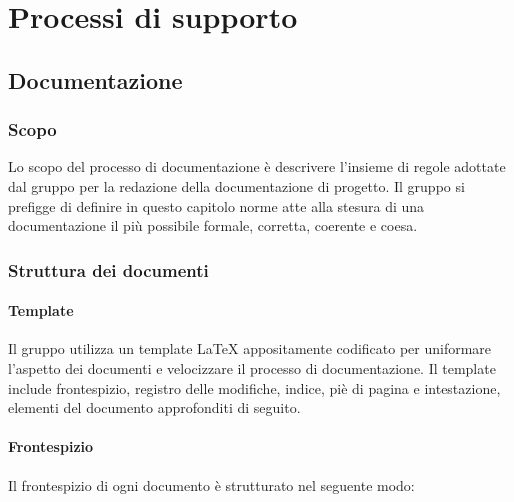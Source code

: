 \documentclass[../NormediProgetto.tex]{subfiles}
\begin{document}

\chapter{Processi di supporto}


\section{Documentazione}

\subsection{Scopo} 

Lo scopo del processo di documentazione è descrivere l'insieme di regole adottate dal gruppo per la redazione della documentazione di progetto. Il gruppo si prefigge di definire in questo capitolo norme atte alla stesura di una documentazione il più possibile formale, corretta, coerente e coesa.


\subsection{Struttura dei documenti}

\subsubsection{Template}

Il gruppo utilizza un template \LaTeX{} appositamente codificato per uniformare l'aspetto dei documenti e velocizzare il processo di documentazione. Il template include frontespizio, registro delle modifiche, indice, piè di pagina e intestazione, elementi del documento approfonditi di seguito. 

\subsubsection{Frontespizio}

Il frontespizio di ogni documento è strutturato nel seguente modo:
\end{document}
